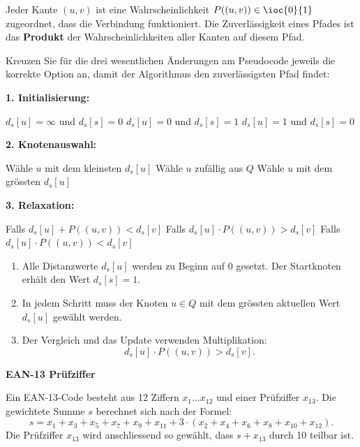 \begin{questions}
Jeder Kante $(u, v)$ ist eine Wahrscheinlichkeit $P((u, v)) \in \ioc{0}{1}$ zugeordnet, dass die Verbindung funktioniert. Die Zuverlässigkeit eines Pfades ist das \textbf{Produkt} der Wahrscheinlichkeiten aller Kanten auf diesem Pfad.

Kreuzen Sie für die drei wesentlichen Änderungen am Pseudocode jeweils die korrekte Option an, damit der Algorithmus den zuverlässigsten Pfad findet:

\textbf{1. Initialisierung:}
\begin{checkboxes}
	\choice $d_s[u] = \infty$ und $d_s[s] = 0$
	\CorrectChoice $d_s[u] = 0$ und $d_s[s] = 1$
	\choice $d_s[u] = 1$ und $d_s[s] = 0$
\end{checkboxes}

\textbf{2. Knotenauswahl:}
\begin{checkboxes}
	\choice Wähle $u$ mit dem kleinsten $d_s[u]$
	\choice Wähle $u$ zufällig aus $Q$
	\CorrectChoice Wähle $u$ mit dem grössten $d_s[u]$
\end{checkboxes}

\textbf{3. Relaxation:}
\begin{checkboxes}
	\choice Falls $d_s[u] + P((u, v)) < d_s[v]$
	\CorrectChoice Falls $d_s[u] \cdot P((u, v)) > d_s[v]$
	\choice Falls $d_s[u] \cdot P((u, v)) < d_s[v]$
\end{checkboxes}

\begin{solution}
\begin{enumerate}
	\item Alle Distanzwerte \(d_s[u]\) werden zu Beginn auf \(0\) gesetzt. Der Startknoten erhält den Wert \(d_s[s] = 1\).

	\item In jedem Schritt muss der Knoten \(u \in Q\) mit dem grössten aktuellen Wert \(d_s[u]\) gewählt werden.

	\item Der Vergleich und das Update verwenden Multiplikation:
	\[
		d_s[u] \cdot P((u,v)) > d_s[v].
	\]
\end{enumerate}
\end{solution}

\clearpage

\question[2]
\textbf{EAN-13 Prüfziffer}

Ein EAN-13-Code besteht aus 12 Ziffern $x_1 \ldots x_{12}$ und einer Prüfziffer $x_{13}$. Die gewichtete Summe $s$ berechnet sich nach der Formel:
\[
	s = x_1 + x_3 + x_5 + x_7 + x_9 + x_{11}
	+ 3 \cdot (x_2 + x_4 + x_6 + x_8 + x_{10} + x_{12}).
\]
Die Prüfziffer $x_{13}$ wird anschliessend so gewählt, dass $s + x_{13}$ durch 10 teilbar ist.


\end{questions}
